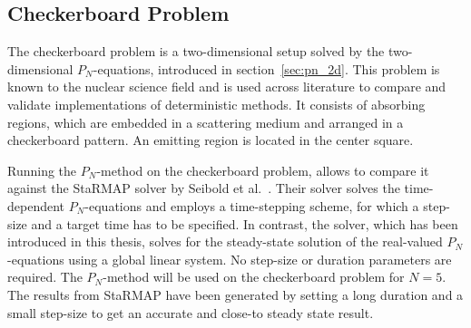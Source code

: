 \subsection{Checkerboard Problem}
\label{sec:pn_results_checkerboard}

The checkerboard problem is a two-dimensional setup solved by the two-dimensional $P_N$-equations, introduced in section~\ref{sec:pn_2d}. This problem is known to the nuclear science field and is used across literature to compare and validate implementations of deterministic methods. It consists of absorbing regions, which are embedded in a scattering medium and arranged in a checkerboard pattern. An emitting region is located in the center square.

Running the $P_N$-method on the checkerboard problem, allows to compare it against the \textsf{StaRMAP} solver by Seibold et al.~\cite{Seibold14}. Their solver solves the time-dependent $P_N$-equations and employs a time-stepping scheme, for which a step-size and a target time has to be specified. In contrast, the solver, which has been introduced in this thesis, solves for the steady-state solution of the real-valued $P_N$-equations using a global linear system. No step-size or duration parameters are required. The $P_N$-method will be used on the checkerboard problem for $N=5$. The results from \textsf{StaRMAP} have been generated by setting a long duration and a small step-size to get an accurate and close-to steady state result.
